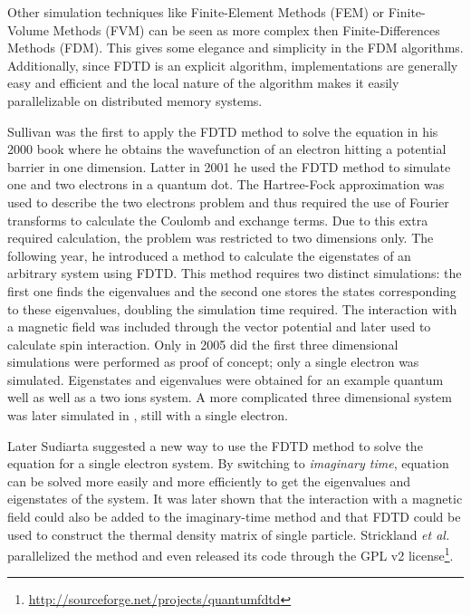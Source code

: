 Other simulation techniques like Finite-Element Methods (FEM) or Finite-Volume
Methods (FVM) can be seen as more complex then Finite-Differences Methods
(FDM). This gives some elegance and simplicity in the FDM algorithms.
Additionally, since FDTD is an explicit algorithm, implementations are
generally easy and efficient and the local nature of the algorithm makes it
easily parallelizable on distributed memory systems.

Sullivan was the first to apply the FDTD method to solve the \schrodinger
equation in his 2000 book\cite{Sullivan2000} where he obtains the wavefunction
of an electron hitting a potential barrier in one dimension.
Latter in 2001 he used the FDTD
method to simulate one and two electrons in a quantum dot\cite{Sullivan2001}.
The Hartree-Fock approximation was used to describe the two electrons problem
and thus required the use of Fourier transforms to calculate the Coulomb
and exchange terms. Due to this extra required calculation, the problem was
restricted to two dimensions only. The following year, he introduced a method
to calculate the eigenstates of an arbitrary system using
FDTD\cite{Sullivan2002}. This method requires two distinct simulations: the
first one finds the eigenvalues and the second one stores the states
corresponding to these eigenvalues, doubling the simulation time required.
The interaction with a magnetic field was included through the vector potential
and later\cite{Sullivan2003,Sullivan2004} used to calculate spin interaction.
Only in 2005 did the first three dimensional
simulations\cite{Sullivan2005a} were performed as proof of concept; only a
single electron was simulated. Eigenstates and eigenvalues were obtained for an
example quantum well as well as a two ions system. A more complicated three
dimensional system was later simulated in \cite{Sullivan2005b}, still with a
single electron.

Later Sudiarta suggested\cite{Sudiarta2007} a new way to use the FDTD method to
solve the \schrodinger equation for a single electron system. By switching to
\textit{imaginary time}, \schrodinger equation can be solved more easily and
more efficiently to get the eigenvalues and eigenstates of the system. It was
later shown that the interaction with a magnetic field could also be added to
the imaginary-time method\cite{Sudiarta2008} and that FDTD could be used to
construct the thermal density matrix of single particle\cite{Sudiarta2009}.
Strickland \textit{et al.} parallelized the method \cite{Strickland2010} and
even released its code through the GPL v2
license\footnote{\url{http://sourceforge.net/projects/quantumfdtd}}.


